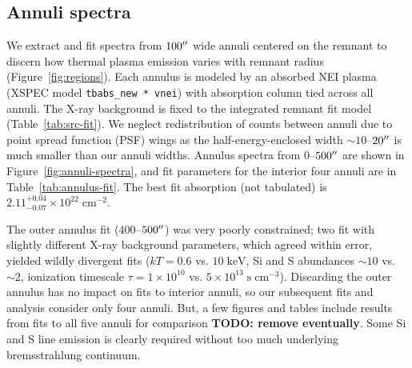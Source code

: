 \documentclass[preprint2,tighten,trackchanges]{aastex6}
\newcommand*{\mt}{\mathrm}
\newcommand*{\unit}[1]{\;\mt{#1}}  %
\newcommand*{\abt}{\mathord{\sim}} %
\newcommand*{\nHUnits}{\times 10^{22} \unit{cm^{-2}}}
\newcommand*{\TauUnits}{\unit{s\;cm^{-3}}}
\begin{document}
\begin{figure*}[!ht]
    \label{fig:src-varyabund}
\end{figure*}

\begin{figure*}[!ht]
    \label{fig:src-varyabund-pn}
\end{figure*}




\subsection{Annuli spectra}

We extract and fit spectra from $100\mbox{$^{\prime\prime}$}$ wide annuli centered on the
remnant to discern how thermal plasma emission varies with remnant radius
(Figure~\ref{fig:regions}).
Each annulus is modeled by an absorbed NEI plasma
(XSPEC model \texttt{tbabs\_new * vnei}) with absorption column tied across
all annuli.
The X-ray background is fixed to the integrated remnant fit model
(Table~\ref{tab:src-fit}).
We neglect redistribution of counts between annuli due to point spread function
(PSF) wings as the half-energy-enclosed width $\abt10$--$20\mbox{$^{\prime\prime}$}$ is much
smaller than our annuli widths.
Annulus spectra from $0$--$500\mbox{$^{\prime\prime}$}$ are shown in
Figure~\ref{fig:annuli-spectra}, and fit parameters for the interior four
annuli are in Table~\ref{tab:annulus-fit}.
The best fit absorption (not tabulated) is $2.11^{+0.04}_{-0.07} \nHUnits$.

The outer annulus fit ($400$--$500\mbox{$^{\prime\prime}$}$) was very poorly constrained;
two fit with slightly different X-ray background parameters, which agreed
within error, yielded wildly divergent fits ($kT = 0.6$ vs. $10 \unit{keV}$,
Si and S abundances $\abt10$ vs. $\abt2$,
ionization timescale $\tau = 1 \times 10^{10}$ vs. $5 \times 10^{13} \TauUnits$).
Discarding the outer annulus has no impact on fits to interior annuli, so our
subsequent fits and analysis consider only four annuli.
But, a few figures and tables include results from fits to all five annuli for
comparison \textbf{TODO: remove eventually}.
Some Si and S line emission is clearly required without too much underlying
bremsstrahlung continuum.
\end{document}

